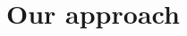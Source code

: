 \documentclass[sigconf]{acmart}
\begin{document}
\section{Our approach} \label{sec:overview}










\end{document}
